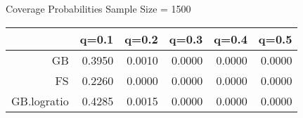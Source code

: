 

 Coverage Probabilities Sample Size =  1500 

\begin{tabular}{rrrrrr}
  \hline
 & q=0.1 & q=0.2 & q=0.3 & q=0.4 & q=0.5 \\ 
  \hline
GB & 0.3950 & 0.0010 & 0.0000 & 0.0000 & 0.0000 \\ 
  FS & 0.2260 & 0.0000 & 0.0000 & 0.0000 & 0.0000 \\ 
  GB.logratio & 0.4285 & 0.0015 & 0.0000 & 0.0000 & 0.0000 \\ 
   \hline
\end{tabular}
\vspace{0.2in}
